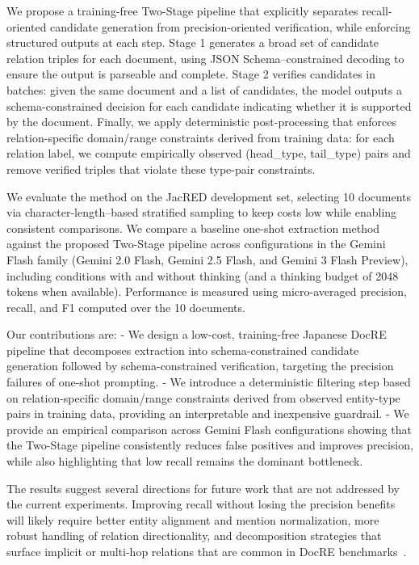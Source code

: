 \documentclass{article} %
\begin{document}
We propose a training-free Two-Stage pipeline that explicitly separates recall-oriented candidate generation from precision-oriented verification, while enforcing structured outputs at each step. Stage 1 generates a broad set of candidate relation triples for each document, using JSON Schema–constrained decoding to ensure the output is parseable and complete. Stage 2 verifies candidates in batches: given the same document and a list of candidates, the model outputs a schema-constrained decision for each candidate indicating whether it is supported by the document. Finally, we apply deterministic post-processing that enforces relation-specific domain/range constraints derived from training data: for each relation label, we compute empirically observed (head\_type, tail\_type) pairs and remove verified triples that violate these type-pair constraints.

We evaluate the method on the JacRED development set, selecting 10 documents via character-length–based stratified sampling to keep costs low while enabling consistent comparisons. We compare a baseline one-shot extraction method against the proposed Two-Stage pipeline across configurations in the Gemini Flash family (Gemini 2.0 Flash, Gemini 2.5 Flash, and Gemini 3 Flash Preview), including conditions with and without thinking (and a thinking budget of 2048 tokens when available). Performance is measured using micro-averaged precision, recall, and F1 computed over the 10 documents.

Our contributions are:
- We design a low-cost, training-free Japanese DocRE pipeline that decomposes extraction into schema-constrained candidate generation followed by schema-constrained verification, targeting the precision failures of one-shot prompting.
- We introduce a deterministic filtering step based on relation-specific domain/range constraints derived from observed entity-type pairs in training data, providing an interpretable and inexpensive guardrail.
- We provide an empirical comparison across Gemini Flash configurations showing that the Two-Stage pipeline consistently reduces false positives and improves precision, while also highlighting that low recall remains the dominant bottleneck.

The results suggest several directions for future work that are not addressed by the current experiments. Improving recall without losing the precision benefits will likely require better entity alignment and mention normalization, more robust handling of relation directionality, and decomposition strategies that surface implicit or multi-hop relations that are common in DocRE benchmarks~\cite{yao-2019-docred,delaunay-2023-comprehensive}.
\end{document}
